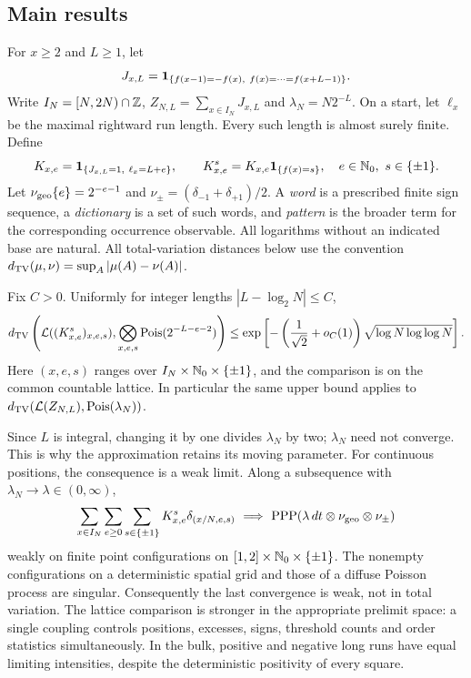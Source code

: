 \subsection{Main results}
For $x\ge2$ and $L\ge1$, let
\begin{equation}\label{eq:start}
 J_{x,L}=\mathbf 1_{\{f(x-1)=-f(x),\ f(x)=\cdots=f(x+L-1)\}}.
\end{equation}
Write $I_N=[N,2N)\cap\mathbb Z$, $Z_{N,L}=\sum_{x\in I_N}J_{x,L}$ and
$\lambda_N=N2^{-L}$. On a start, let $\ell_x$ be the maximal rightward run
length. Every such length is almost surely finite. Define
\[
 K_{x,e}=\1_{\{J_{x,L}=1,\ \ell_x=L+e\}},\qquad
 K^s_{x,e}=K_{x,e}\1_{\{f(x)=s\}},\quad e\in\NN,\ s\in\{\pm1\}.
\]
Let $\nu_{\rm geo}\{e\}=2^{-e-1}$ and
$\nu_\pm=(\delta_{-1}+\delta_{+1})/2$.
A \emph{word} is a prescribed finite sign sequence, a \emph{dictionary}
is a set of such words, and \emph{pattern} is the broader term for the
corresponding occurrence observable. All logarithms without an indicated
base are natural. All total-variation distances below use the convention
$d_{\mathrm{TV}}(\mu,\nu)=\sup_A|\mu(A)-\nu(A)|$.

\begin{theorem}\label{thm:poisson-main}
Fix $C>0$. Uniformly for integer lengths $|L-\log_2N|\le C$,
\begin{equation}\label{eq:poisson-main}
 d_{\mathrm{TV}}\left(\mathcal L((K^s_{x,e})_{x,e,s}),
       \bigotimes_{x,e,s}\operatorname{Pois}(2^{-L-e-2})\right)
 \le \exp\left[-\left(\frac1{\sqrt2}+o_C(1)\right)
                    \sqrt{\log N\log\log N}\right].
\end{equation}
Here $(x,e,s)$ ranges over $I_N\times\mathbb N_0\times\{\pm1\}$, and the
comparison is on the common countable lattice. In particular the same
upper bound applies to $d_{\mathrm{TV}}(\mathcal L(Z_{N,L}),\operatorname{Pois}(\lambda_N))$.
\end{theorem}
Since $L$ is integral, changing it by one divides $\lambda_N$ by two;
$\lambda_N$ need not converge. This is why the approximation retains
its moving parameter. For continuous positions, the consequence is a weak limit. Along a
subsequence with $\lambda_N\to\lambda\in(0,\infty)$,
\[
 \sum_{x\in I_N}\sum_{e\ge0}\sum_{s\in\{\pm1\}}K^s_{x,e}\delta_{(x/N,e,s)}
 \ \Longrightarrow\ {\rm PPP}(\lambda\,dt\otimes\nu_{\rm geo}\otimes\nu_\pm)
\]
weakly on finite point configurations on $[1,2]\times\mathbb N_0\times\{\pm1\}$.
The nonempty configurations on a deterministic spatial grid and those of a
diffuse Poisson process are singular. Consequently the last convergence is
weak, not in total variation. The lattice comparison is stronger in the
appropriate prelimit space: a single coupling controls positions, excesses,
signs, threshold counts and order statistics simultaneously. In the bulk,
positive and negative long runs have equal limiting intensities, despite
the deterministic positivity of every square.

